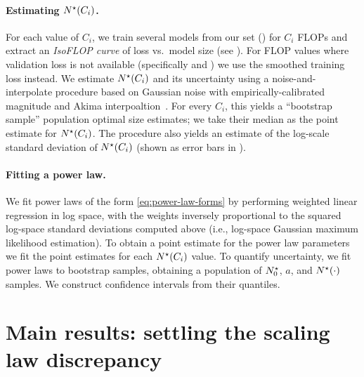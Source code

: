 \documentclass{article}
\theoremstyle{plain}
\theoremstyle{definition}
\theoremstyle{remark}
\newcommand{\maybeSubscript}[1]{
  \ifthenelse{\equal{#1}{}}{}{_{#1}}%
}
\newcommand{\params}[1][]{N\maybeSubscript{#1}}
\newcommand{\paramsStar}[1][]{\params[#1]^{\star}}
\newcommand{\nExp}{a}
\begin{document}
\paragraph{Estimating $\paramsStar(C_i)$.} For each value of $C_i$, we train several models from our set () for $C_i$ FLOPs and extract an \emph{IsoFLOP curve} of loss vs.\ model size (see ).
{For FLOP values where validation loss is not available} (specifically  and ) we use the smoothed training loss instead.
We estimate  $\paramsStar(C_i)$ and its uncertainty using a noise-and-interpolate procedure based on Gaussian noise with empirically-calibrated magnitude and Akima interpoaltion~\cite{akima1970new}. For every $C_i$, this yields a ``bootstrap sample'' population optimal size estimates; we take their median as the point estimate for $\paramsStar(C_i)$. The procedure also yields an estimate of the log-scale standard deviation of $\paramsStar(C_i)$ (shown as error bars in ). 

\paragraph{Fitting a power law.} We fit power laws of the form \eqref{eq:power-law-forms} by performing weighted linear regression in log space, with the weights inversely proportional to the squared log-space standard deviations computed above (i.e., log-space Gaussian maximum likelihood estimation). To obtain a point estimate for the power law parameters we fit the point estimates for each $\paramsStar(C_i)$ value. To quantify uncertainty, we fit power laws to bootstrap samples, obtaining a population of $\paramsStar_0$, $\nExp$, and $\paramsStar(\cdot)$ samples. We construct confidence intervals from their quantiles.
\section{Main results: settling the scaling law discrepancy}\label{sec:main-results}
\end{document}
